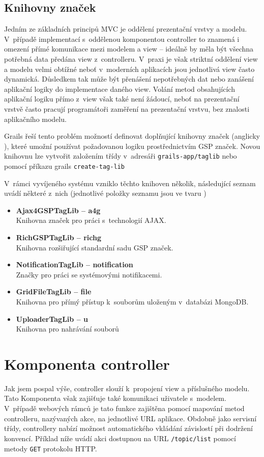 \subsection{Knihovny značek}
Jedním ze základních principů MVC je oddělení prezentační vrstvy a modelu. V~případě implementací s~oddělenou komponentou controller to znamená i omezení přímé komunikace mezi modelem a view  -- ideálně by měla být všechna potřebná data předána view z~controlleru. V~praxi je však striktní oddělení view a modelu velmi obtížné neboť v~moderních aplikacích jsou jednotlivá view často dynamická. Důsledkem tak může být přenášení nepotřebných dat nebo zanášení aplikační logiky do implementace daného view. Volání metod obsahujících aplikační logiku přímo z~view však také není žádoucí, neboť na prezentační vrstvě často pracují programátoři zaměření na prezentační vrstvu, bez znalosti aplikačního modelu.


Grails řeší tento problém možností definovat doplňující knihovny značek (anglicky ), které umožní používat požadovanou logiku prostřednictvím GSP značek. Novou knihovnu lze vytvořit založením třídy v~adresáři \texttt{grails-app/taglib} nebo pomocí příkazu grails \texttt{create-tag-lib}

V~rámci vyvíjeného systému vzniklo těchto knihoven několik, následující seznam uvádí některé z~nich (jednotlivé položky seznamu jsou ve tvaru )
\begin{itemize}
\item \textbf{Ajax4GSPTagLib -- a4g} \\
Knihovna značek pro práci s~technologií AJAX.
\item \textbf{RichGSPTagLib -- richg}\\
Knihovna rozšiřující standardní sadu GSP značek.
\item \textbf{NotificationTagLib -- notification}\\
Značky pro práci se systémovými notifikacemi.
\item \textbf{GridFileTagLib -- file}\\
Knihovna pro přímý přístup k~souborům uloženým v~databázi MongoDB.
\item \textbf{UploaderTagLib -- u}\\
Knihovna pro nahrávání souborů
\end{itemize}

\section{Komponenta controller }
Jak jsem pospal výše, controller slouží k~propojení view a příslušného modelu. Tato Komponenta však zajišťuje také komunikaci uživatele s~modelem. V~případě webových rámců je tato funkce zajištěna pomocí mapování metod controlleru, nazývaných akce, na jednotlivé URL aplikace. Obdobně jako servisní třídy, controllery nabízí možnost automatického vkládání závislostí při dodržení konvencí. Příklad níže uvádí akci dostupnou na URL \texttt{/topic/list} pomocí metody \texttt{GET} protokolu HTTP.

